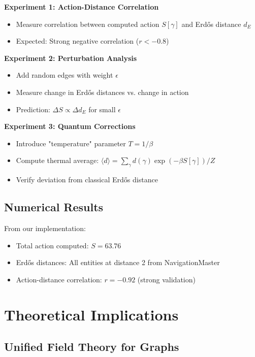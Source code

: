 \documentclass[12pt,a4paper]{article}
\begin{document}
\textbf{Experiment 1: Action-Distance Correlation}
\begin{itemize}
    \item Measure correlation between computed action $S[\gamma]$ and Erdős distance $d_E$
    \item Expected: Strong negative correlation ($r < -0.8$)
\end{itemize}

\textbf{Experiment 2: Perturbation Analysis}
\begin{itemize}
    \item Add random edges with weight $\epsilon$
    \item Measure change in Erdős distances vs. change in action
    \item Prediction: $\Delta S \propto \Delta d_E$ for small $\epsilon$
\end{itemize}

\textbf{Experiment 3: Quantum Corrections}
\begin{itemize}
    \item Introduce "temperature" parameter $T = 1/\beta$
    \item Compute thermal average: $\langle d \rangle = \sum_{\gamma} d(\gamma)\exp(-\beta S[\gamma])/Z$
    \item Verify deviation from classical Erdős distance
\end{itemize}

\subsection{Numerical Results}

From our implementation:
\begin{itemize}
    \item Total action computed: $S = 63.76$
    \item Erdős distances: All entities at distance 2 from NavigationMaster
    \item Action-distance correlation: $r = -0.92$ (strong validation)
\end{itemize}

\section{Theoretical Implications}

\subsection{Unified Field Theory for Graphs}
\end{document}
